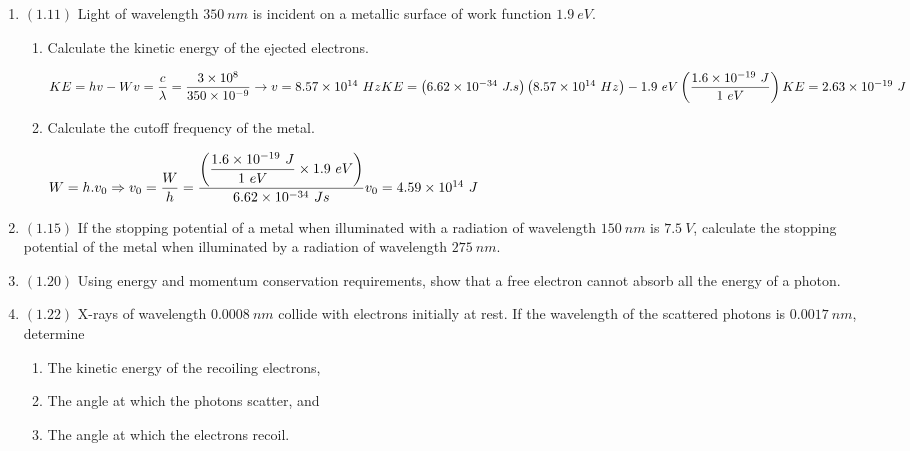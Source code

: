 \documentclass[fleqn]{article}
\begin{document}
  \begin{enumerate}
    \item $(\mathbf{1.11})$ Light of wavelength $350 ~ nm$ is incident on a metallic surface of work function $1.9 ~ eV$.
      \begin{enumerate}
        \item Calculate the kinetic energy of the ejected electrons.

          \textcolor{hwColor}{
            $
              KE=hv-W \\
              \\
              v=\dfrac{c}{\lambda}=\dfrac{3 \times 10^8}{350 \times 10^{-9}} \rightarrow v=8.57 \times 10^{14} ~ Hz \\
              \\
              KE=\left(6.62 \times 10^{-34} ~ J.s\right)\left(8.57 \times 10^{14} ~ Hz\right)-1.9 ~ eV\left(\dfrac{1.6 \times 10^{-19} ~ J}{1 ~ eV}\right) \\
              \\
              KE=2.63 \times 10^{-19} ~ J
            $
          }

        \item Calculate the cutoff frequency of the metal.

          \textcolor{hwColor}{
            $
              W=h.v_0 \Rightarrow v_0=\dfrac{W}{h}=\dfrac{\left(\dfrac{1.6 \times 10^{-19} ~ J}{1 ~ eV} \times 1.9 ~ eV\right)}{6.62 \times 10^{-34} ~ Js} \\
              \\
              v_0=4.59 \times 10^{14} ~ J
            $
          }

      \end{enumerate}

    \item $(\mathbf{1.15})$ If the stopping potential of a metal when illuminated with a radiation of wavelength $150 ~ nm$ is $7.5 ~ V$, 
    calculate the stopping potential of the metal when illuminated by a radiation of wavelength $275 ~ nm$.


    \item $(\mathbf{1.20})$ Using energy and momentum conservation requirements, show that a free electron cannot absorb all the energy of a photon.

    \item $(\mathbf{1.22})$ X-rays of wavelength $0.0008 ~ nm$ collide with electrons initially at rest. If the wavelength of the scattered photons is 
    $0.0017 ~ nm$, determine
      \begin{enumerate}
        \item The kinetic energy of the recoiling electrons,
        \item The angle at which the photons scatter, and
        \item The angle at which the electrons recoil. 
      \end{enumerate}


\end{enumerate}
\end{document}

